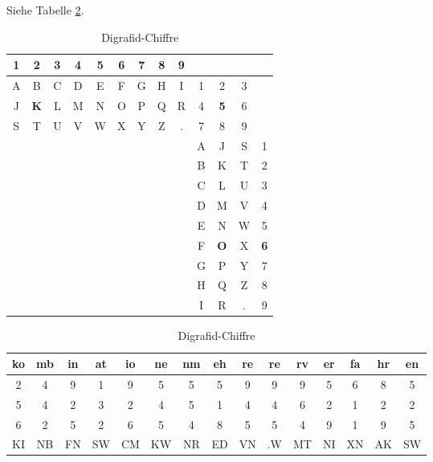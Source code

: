 \begin{refsegment}
\begin{itemize}
   Siehe Tabelle \ref{Digrafid-table-reference}.

   \begin{table}[ht]

   \begin{center}
   \begin{tabular}{|ccccccccc|ccc|c|}
   \hline	
	1 & \textbf{2} & 3 & 4 & 5 & 6 & 7 & 8 & 9 &   &   &   &  \\
   \hline

	A & B & C & D & E & F & G & H & I & 1 & 2 & 3 &  \\
	J & \textbf{K} & L & M & N & O & P & Q & R & 4 & \textbf{5} & 6 &  \\
	S & T & U & V & W & X & Y & Z & . & 7 & 8 & 9 &  \\
   \hline
	  &   &   &   &   &   &   &   &   & A & J & S & 1\\
	  &   &   &   &   &   &   &   &   & B & K & T & 2\\
	  &   &   &   &   &   &   &   &   & C & L & U & 3\\
	  &   &   &   &   &   &   &   &   & D & M & V & 4\\
	  &   &   &   &   &   &   &   &   & E & N & W & 5\\
	  &   &   &   &   &   &   &   &   & F & \textbf{O} & X & \textbf{6}\\
	  &   &   &   &   &   &   &   &   & G & P & Y & 7\\
	  &   &   &   &   &   &   &   &   & H & Q & Z & 8\\
	  &   &   &   &   &   &   &   &   & I & R & . & 9\\
   \hline
   \end{tabular}
   \end{center}

   \begin{center}
   \begin{tabular}{|c@{ }c@{ }c|c@{ }c@{ }c|c@{ }c@{ }c|c@{ }c@{ }c|c@{ }c@{ }c|}
   \hline		
	ko & mb & in & at & io & ne & nm & eh & re & re & rv & er & fa & hr & en\\
   \hline
	2  & 4  & 9  & 1  & 9  & 5  & 5  & 5  & 9  & 9  & 9  & 5  & 6  & 8  & 5\\
	5  & 4  & 2  & 3  & 2  & 4  & 5  & 1  & 4  & 4  & 6  & 2  & 1  & 2  & 2\\
	6  & 2  & 5  & 2  & 6  & 5  & 4  & 8  & 5  & 5  & 4  & 9  & 1  & 9  & 5\\
   \hline
	KI & NB & FN & SW & CM & KW	& NR & ED & VN & .W & MT & NI & XN & AK & SW\\
   \hline
   \end{tabular}
   \caption{Digrafid-Chiffre}
   \label{Digrafid-table-reference}
   \end{center}


\end{table}
\end{itemize}
\end{refsegment}
